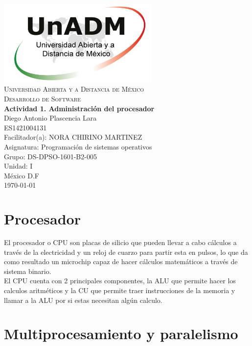 \documentclass[spanish,12pt,letterpapper]{article}
\begin{document}
	\begin{titlepage}
		\begin{center}
			\includegraphics[width=0.6\textwidth]{../logoUnADM}~\\[1cm] 
			\textsc{Universidad Abierta y a Distancia de México}\\[0.8cm]
			\textsc{Desarrollo de Software}\\[1.8cm]
			
			\textbf{ \Large Actividad 1. Administración del procesador}\\[3cm]
			
			Diego Antonio Plascencia Lara\\ ES1421004131 \\[0.4cm]
			Facilitador(a): NORA CHIRINO MARTINEZ\\
			Asignatura: Programación de sistemas operativos\\
			Grupo: DS-DPSO-1601-B2-005 \\
			Unidad: I \\
			
			\vfill México D.F\\{\today}
			
		\end{center}
	\end{titlepage}
	
	\section{Procesador}
	El procesador o CPU son placas de silicio que pueden llevar a cabo cálculos a través de la electricidad y un reloj de cuarzo para partir esta en pulsos, lo que da como resultado un microchip capaz de hacer cálculos matemáticos a través de sistema binario.\\
	
	El CPU cuenta con 2 principales componentes, la ALU que permite hacer los calculos aritméticos y la CU que permite traer instrucciones de la memoria y llamar a la ALU por si estas necesitan algún calculo.
	
	\section{Multiprocesamiento y paralelismo}
\end{document}
